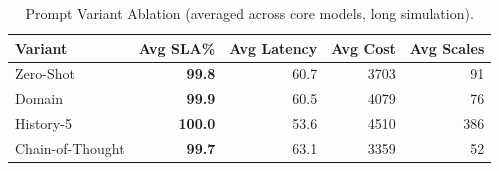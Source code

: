 \begin{table}[t]
\centering\small
\caption{Prompt Variant Ablation (averaged across core models, long simulation).}
\label{tab:ablation}
\begin{tabular}{lrrrr}
\toprule
Variant & Avg SLA\% & Avg Latency & Avg Cost & Avg Scales \\
\midrule
Zero-Shot & \textbf{99.8} & 60.7 & 3703 & 91 \\
Domain & \textbf{99.9} & 60.5 & 4079 & 76 \\
History-5 & \textbf{100.0} & 53.6 & 4510 & 386 \\
Chain-of-Thought & \textbf{99.7} & 63.1 & 3359 & 52 \\
\bottomrule
\end{tabular}
\end{table}
